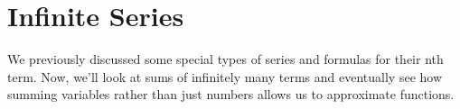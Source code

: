 \chapter{Infinite Series}
We previously discussed some special types of series and formulas for their nth term.
Now, we'll look at sums of infinitely many terms and eventually see how summing variables rather than just numbers allows us to approximate functions.




